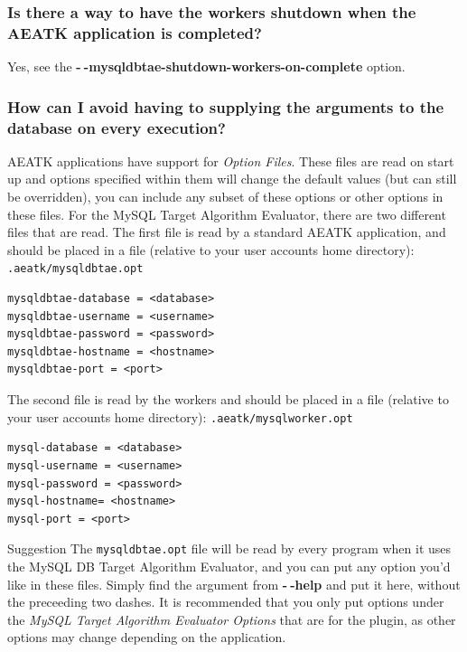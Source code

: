 \documentclass[11pt,letterpaper,oneside]{article}
\begin{document}
\subsubsection{Is there a way to have the workers shutdown when the AEATK application is completed?}

Yes, see the \textbf{-$~\!$-mysqldbtae-shutdown-workers-on-complete} option.


\subsubsection{How can I avoid having to supplying the arguments to the database on every execution?}
\label{faq:optionFiles}

AEATK applications have support for \textit{Option Files}. These files are read on start up and options specified within them will change the default values (but can still be overridden), you can include any subset of these options or other options in these files. For the MySQL Target Algorithm Evaluator, there are two different files that are read. The first file is read by a standard AEATK application, and should be placed in a file (relative to your user accounts home directory): \texttt{.aeatk/mysqldbtae.opt}

\begin{verbatim}
mysqldbtae-database = <database>
mysqldbtae-username = <username>
mysqldbtae-password = <password>
mysqldbtae-hostname = <hostname>
mysqldbtae-port = <port>
\end{verbatim}

The second file is read by the workers and should be placed in a file (relative to your user accounts home directory):  \texttt{.aeatk/mysqlworker.opt}

\begin{verbatim}
mysql-database = <database>
mysql-username = <username>
mysql-password = <password>
mysql-hostname= <hostname>
mysql-port = <port>
\end{verbatim}

\begin{bclogo}[logo=\bclampe, couleurBarre=red, noborder=true]{Suggestion}
The \texttt{mysqldbtae.opt} file will be read by every program when it uses the MySQL DB Target Algorithm Evaluator, and you can put any option you'd like in these files. Simply find the argument from \textbf{-$~\!$-help} and put it here, without the preceeding two dashes. It is recommended that you only put options under the \textit{MySQL Target Algorithm Evaluator Options} that are for the plugin, as other options may change depending on the application.
\end{bclogo}
\end{document}
